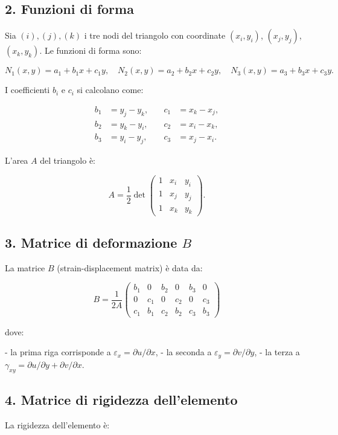 \documentclass{article}
\begin{document}
\subsection*{2. Funzioni di forma}
Sia \((i), (j), (k)\) i tre nodi del triangolo con coordinate \((x_i,y_i)\), \((x_j,y_j)\), \((x_k,y_k)\). Le funzioni di forma sono:

\[
N_1(x,y) = a_1 + b_1 x + c_1 y,\quad
N_2(x,y) = a_2 + b_2 x + c_2 y,\quad
N_3(x,y) = a_3 + b_3 x + c_3 y.
\]

I coefficienti \(b_i\) e \(c_i\) si calcolano come:

\[
\begin{aligned}
b_1 &= y_j - y_k,\quad &c_1 &= x_k - x_j,\\
b_2 &= y_k - y_i,\quad &c_2 &= x_i - x_k,\\
b_3 &= y_i - y_j,\quad &c_3 &= x_j - x_i.
\end{aligned}
\]

L’area \(A\) del triangolo è:

\[
A = \frac{1}{2} \det
\begin{pmatrix}
1 & x_i & y_i\\
1 & x_j & y_j\\
1 & x_k & y_k
\end{pmatrix}.
\]

\subsection*{3. Matrice di deformazione \(B\)}
La matrice \(B\) (strain-displacement matrix) è data da:

\[
B = \frac{1}{2A}
\begin{pmatrix}
b_1 & 0   & b_2 & 0   & b_3 & 0 \\
0   & c_1 & 0   & c_2 & 0   & c_3 \\
c_1 & b_1 & c_2 & b_2 & c_3 & b_3
\end{pmatrix}
\]

dove:

- la prima riga corrisponde a \(\varepsilon_x = \partial u / \partial x\),  
- la seconda a \(\varepsilon_y = \partial v / \partial y\),  
- la terza a \(\gamma_{xy} = \partial u / \partial y + \partial v / \partial x\).

\subsection*{4. Matrice di rigidezza dell'elemento}
La rigidezza dell'elemento è:
\end{document}
